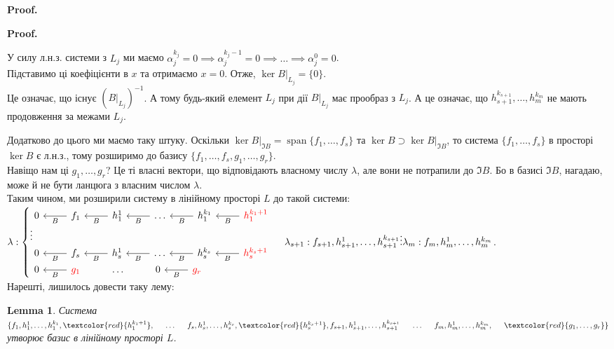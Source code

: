 \documentclass[a4paper, 10pt]{article}
\makeatletter
\theoremstyle{theoremdd}
\newtheorem{lemma}[theorem]{Lemma}
\DeclareMathOperator{\linspan}{span}
\renewenvironment{proof}[1][Proof.\\]{\par
\pushQED{\hfill \qed}%
\normalfont \topsep6\p@\@plus6\p@\relax
\trivlist
\item\relax
{\bfseries
#1\@addpunct{.}}\hspace\labelsep\ignorespaces
}{%
\popQED\endtrivlist\@endpefalse
}
\makeatother
\begin{document}
\begin{proof}
\begin{proof}
У силу л.н.з. системи з $L_j$ ми маємо $\alpha_j^{k_j} = 0 \implies \alpha_j^{k_j-1} = 0 \implies \dots \implies \alpha_j^0 = 0$.\\
Підставимо ці коефіцієнти в $x$ та отримаємо $x = 0$. Отже, $\ker B|_{L_j} = \{0\}$.\\
Це означає, що існує $(B|_{L_j})^{-1}$. А тому будь-який елемент $L_j$ при дії $B|_{L_j}$ має прообраз з $L_j$. А це означає, що $h_{s+1}^{k_{s+1}},\dots,h_m^{k_m}$ не мають продовження за межами $L_{j}$.
\end{proof}

Додатково до цього ми маємо таку штуку. Оскільки $\ker B|_{\Im B} = \linspan \{f_1,\dots,f_s\}$ та $\ker B \supset \ker B|_{\Im B}$, то система $\{f_1,\dots,f_s\}$ в просторі $\ker B$ є л.н.з., тому розширимо до базису $\{f_1,\dots,f_s,g_1,\dots,g_r\}$.\\
Навіщо нам ці $g_1,\dots,g_r$? Це ті власні вектори, що відповідають власному числу $\lambda$, але вони не потрапили до $\Im B$. Бо в базисі $\Im B$, нагадаю, може й не бути ланцюга з власним числом $\lambda$.
\bigskip \\
Таким чином, ми розширили систему в лінійному просторі $L$ до такой системи:\\
$ \lambda: \begin{cases}
\begin{tikzcd}
0 & f_1 \arrow{l}{B} & h_1^1 \arrow{l}{B} & \dots \arrow{l}{B} & h_1^{k_1} \arrow{l}{B} & \textcolor{red}{h_1^{k_1+1}} \arrow{l}{B}
\end{tikzcd}\\
\vdots \\
\begin{tikzcd}
0 & f_s \arrow{l}{B} & h_s^1 \arrow{l}{B} & \dots \arrow{l}{B} & h_s^{k_s} \arrow{l}{B} & \textcolor{red}{h_s^{k_s+1}} \arrow{l}{B}
\end{tikzcd}\\
\begin{tikzcd}
0 & \textcolor{red}{g_1} \arrow{l}{B} & \dots & 0 & \textcolor{red}{g_r} \arrow{l}{B} &
\end{tikzcd}
\end{cases}
\\
\lambda_{s+1}: f_{s+1}, h_{s+1}^1,\dots,h_{s+1}^{k_{s+1}}\\
\vdots\\
\lambda_m: f_{m}, h_{m}^1,\dots,h_{m}^{k_{m}}
$.\\
Нарешті, лишилось довести таку лему:
\begin{lemma}
Система $\{f_1,h_1^1,\dots,h_1^{k_1},\textcolor{red}{h_1^{k_1+1}}, \hspace{0.5cm} \dots \hspace{0.5cm} f_s, h_s^{1}, \dots,h_s^{k_s}, \textcolor{red}{h_s^{k_s+1}}, \\ f_{s+1}, h_{s+1}^1, \dots, h_{s+1}^{k_{s+1}} \hspace{0.5cm} \dots \hspace{0.5cm} f_{m}, h_{m}^1, \dots, h_{m}^{k_m}, \hspace{0.5cm} \textcolor{red}{g_1, \dots, g_r}\}$ утворює базис в лінійному просторі $L$.
\end{lemma}


\end{proof}
\end{document}
